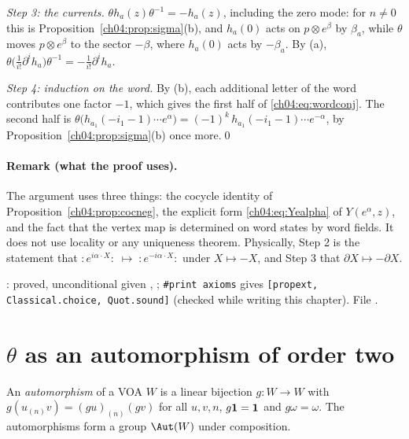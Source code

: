 \emph{Step 3: the currents.} $\theta h_a(z)\theta^{-1}=-h_a(z)$, including the zero mode: for
$n\neq0$ this is Proposition~\ref{ch04:prop:sigma}(b), and $h_a(0)$ acts on $p\otimes e^\beta$ by
$\beta_a$, while $\theta$ moves $p\otimes e^\beta$ to the sector $-\beta$, where $h_a(0)$ acts by
$-\beta_a$. By (a), $\theta\big(\tfrac1{i!}\partial^ih_a\big)\theta^{-1}=-\tfrac1{i!}\partial^ih_a$.

\emph{Step 4: induction on the word.} By (b), each additional letter of the word contributes one
factor $-1$, which gives the first half of \eqref{ch04:eq:wordconj}. The second half is
$\theta\big(h_{a_1}(-i_1-1)\cdots e^\alpha\big)=(-1)^k\,h_{a_1}(-i_1-1)\cdots e^{-\alpha}$, by
Proposition~\ref{ch04:prop:sigma}(b) once more.\qed

\paragraph{Remark (what the proof uses).} The argument uses three things: the cocycle identity of
Proposition~\ref{ch04:prop:cocneg}, the explicit form \eqref{ch04:eq:Yealpha} of $Y(e^\alpha,z)$, and the
fact that the vertex map is determined on word states by word fields. It does not use locality or
any uniqueness theorem. Physically, Step 2 is the statement that
$:\!e^{i\alpha\cdot X}\!:\;\mapsto\;:\!e^{-i\alpha\cdot X}\!:$ under $X\mapsto -X$, and Step 3 that
$\partial X\mapsto-\partial X$.

\begin{status}
: proved, unconditional given , ;
\texttt{\#print axioms} gives \texttt{[propext, Classical.choice, Quot.sound]} (checked while
writing this chapter). File .
\end{status}

\section{\texorpdfstring{$\theta$}{theta} as an automorphism of order two}\label{ch04:sec:aut}

\begin{definition}\label{ch04:def:aut}
An \emph{automorphism} of a VOA $W$ is a linear bijection $g:W\to W$ with
$g(u_{(n)}v)=(gu)_{(n)}(gv)$ for all $u,v,n$, $g\mathbf{1}=\mathbf{1}$ and $g\omega=\omega$. The
automorphisms form a group $\Aut(W)$ under composition.
\end{definition}

